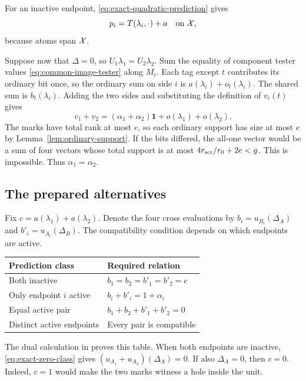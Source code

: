 For an inactive endpoint, \eqref{eq:exact-quadratic-prediction} gives
\begin{equation}\label{eq:exact-zero-class}
 p_i=T(\lambda_i,\cdot)+a\quad\text{on }\mathcal X,
\end{equation}
because atoms span \(\mathcal X\).

Suppose now that \(\Delta=0\), so \(U_1\lambda_1=U_2\lambda_2\).
Sum the equality of component tester values
\eqref{eq:common-image-tester} along \(M_t\). Each tag except \(t\) contributes its ordinary bit
once, so the ordinary sum on side \(i\) is
\(a(\lambda_i)+o_t(\lambda_i)\). The shared sum is \(b_t(\lambda_i)\).
Adding the two sides and substituting the definition of \(v_i(t)\) gives
\[
 v_1+v_2=(\alpha_1+\alpha_2)\mathbf1+o(\lambda_1)+o(\lambda_2).
\]
The marks have total rank at most \(e\), so each ordinary support has
size at most \(e\) by Lemma~\ref{lem:ordinary-support}. If the bits differed,
the all-one vector would be a sum of four vectors whose total support is
at most \(4r_{\rm scr}/r_0+2e<g\). This is impossible. Thus
\(\alpha_1=\alpha_2\).

\subsection{The prepared alternatives}\label{subsec:prepared-patterns}

Fix \(c=a(\lambda_1)+a(\lambda_2)\). Denote the four cross
evaluations by \(b_i=u_{B_i}(\Delta_A)\) and \(b'_i=u_{A_i}(\Delta_B)\).
The compatibility condition depends on which endpoints are active.

\begin{center}
\begin{tabular}{ll}
\toprule
Prediction class & Required relation\\
\midrule
Both inactive & \(b_1=b_2=b'_1=b'_2=c\)\\
Only endpoint \(i\) active & \(b_i+b'_i=1+\alpha_i\)\\
Equal active pair & \(b_1+b_2+b'_1+b'_2=0\)\\
Distinct active endpoints & Every pair is compatible\\
\bottomrule
\end{tabular}
\end{center}
The dual calculation in  proves this table.
When both endpoints are inactive, \eqref{eq:exact-zero-class} gives
\((u_{A_1}+u_{A_2})(\Delta_A)=0\). If also \(\Delta_A=0\), then
\(c=0\). Indeed, \(c=1\) would make the two marks
witness a hole inside the unit.

